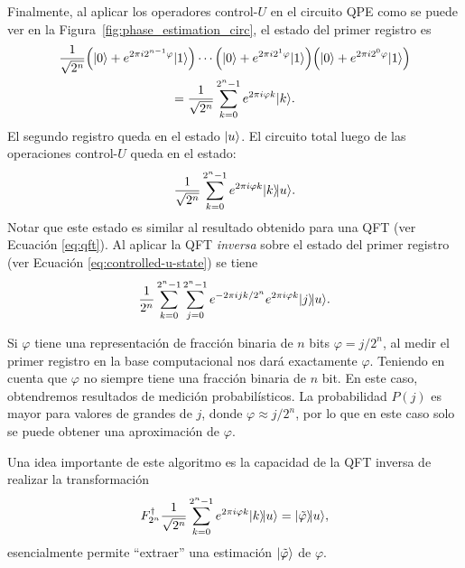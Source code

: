 Finalmente, al aplicar los operadores control-$U$ en el circuito QPE como se puede ver en la Figura~\ref{fig:phase_estimation_circ}, el estado del primer registro es
\begin{gather}
  \dfrac{1}{\sqrt{2^n}}\left(\ket{0} + e^{2\pi i 2^{n-1} \varphi}\ket{1}\right)
  \dotsb
  \left(\ket{0} + e^{2\pi i 2^1 \varphi}\ket{1}\right)
  \left(\ket{0} + e^{2\pi i 2^0 \varphi}\ket{1}\right) \\
  = \dfrac{1}{\sqrt{2^n}}\sum_{k=0}^{2^n-1} e^{2\pi i\varphi k}\ket{k}.
\end{gather}
El segundo registro queda en el estado $\ket{u}$. El circuito total luego de las operaciones control-$U$ 
queda en el estado:
\begin{equation} \label{eq:controlled-u-state}
  \dfrac{1}{\sqrt{2^n}}\sum_{k=0}^{2^n-1} e^{2\pi i\varphi k}\ket{k}\!\ket{u}.
\end{equation}
Notar que este estado es similar al resultado obtenido para una  QFT (ver Ecuación \ref{eq:qft}). 
Al aplicar la QFT \emph{inversa} sobre el estado del primer registro
(ver Ecuación \ref{eq:controlled-u-state}) se tiene
\begin{equation}
  \dfrac{1}{2^n}\sum_{k=0}^{2^n-1}\sum_{j=0}^{2^n-1} e^{-2\pi ijk/2^n} e^{2\pi i\varphi k}\ket{j}\!\ket{u}.
\end{equation}

Si $\varphi$ tiene una representación de fracción binaria de $n$ bits $\varphi=j/2^n $, al medir el primer registro en la base computacional nos dará exactamente $\varphi$. Teniendo en cuenta que $\varphi$ no siempre tiene una fracción binaria de $n$ bit. En este caso, obtendremos resultados de medición probabilísticos. La probabilidad $P(j)$ es mayor para valores de grandes de $j$, donde $\varphi\approx j/2^n$, por lo que en este caso solo se puede obtener una aproximación de $\varphi $.

Una idea importante de este algoritmo es la capacidad de la QFT inversa de realizar la transformación
\begin{equation}
  F_{2^n}^\dagger
  \dfrac{1}{\sqrt{2^n}}\sum_{k=0}^{2^n-1} e^{2\pi i\varphi k}\ket{k}\!\ket{u} = \ket{\tilde{\varphi}}\!\ket{u},
\end{equation}
esencialmente permite ``extraer'' una estimación $\ket{\tilde{\varphi}}$ de $\varphi$.
